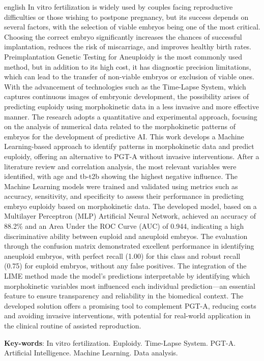 \begin{resumo}[Abstract]
 \begin{otherlanguage*}{english}
    In vitro fertilization is widely used by couples facing reproductive difficulties or those wishing to postpone pregnancy, but its success depends on several factors, with the selection of viable embryos being one of the most critical. Choosing the correct embryo significantly increases the chances of successful implantation, reduces the risk of miscarriage, and improves healthy birth rates. Preimplantation Genetic Testing for Aneuploidy is the most commonly used method, but in addition to its high cost, it has diagnostic precision limitations, which can lead to the transfer of non-viable embryos or exclusion of viable ones. With the advancement of technologies such as the Time-Lapse System, which captures continuous images of embryonic development, the possibility arises of predicting euploidy using morphokinetic data in a less invasive and more effective manner. The research adopts a quantitative and experimental approach, focusing on the analysis of numerical data related to the morphokinetic patterns of embryos for the development of predictive AI. This work develops a Machine Learning-based approach to identify patterns in morphokinetic data and predict euploidy, offering an alternative to PGT-A without invasive interventions. After a literature review and correlation analysis, the most relevant variables were identified, with age and tb-t2b showing the highest negative influence. The Machine Learning models were trained and validated using metrics such as accuracy, sensitivity, and specificity to assess their performance in predicting embryo euploidy based on morphokinetic data. The developed model, based on a Multilayer Perceptron (MLP) Artificial Neural Network, achieved an accuracy of 88.2\% and an Area Under the ROC Curve (AUC) of 0.944, indicating a high discriminative ability between euploid and aneuploid embryos. The evaluation through the confusion matrix demonstrated excellent performance in identifying aneuploid embryos, with perfect recall (1.00) for this class and robust recall (0.75) for euploid embryos, without any false positives. The integration of the LIME method made the model's predictions interpretable by identifying which morphokinetic variables most influenced each individual prediction—an essential feature to ensure transparency and reliability in the biomedical context. The developed solution offers a promising tool to complement PGT-A, reducing costs and avoiding invasive interventions, with potential for real-world application in the clinical routine of assisted reproduction.
  \vspace{\onelineskip}
 
  \noindent 
  \textbf{Key-words}: In vitro fertilization. Euploidy. Time-Lapse System. PGT-A. Artificial Intelligence. Machine Learning. Data analysis.
 \end{otherlanguage*}
\end{resumo}
